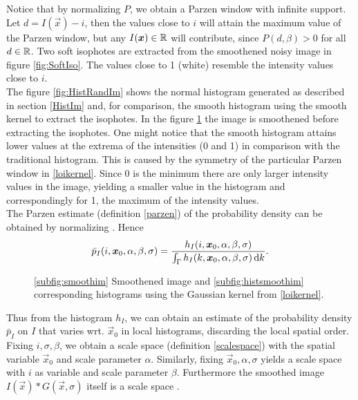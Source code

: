Notice that by normalizing $P$, we obtain a Parzen window with infinite support. Let $d=I(\vec{x})-i$, then the values close to $i$ will attain the maximum value of the Parzen window, but any $I(\boldsymbol{x} )\in \mathbb R$ will contribute, since $P(d,\beta)>0$ for all $d\in\mathbb R$. Two soft isophotes are extracted from the smoothened noisy image in figure \ref{fig:SoftIso}. The values close to 1 (white) resemble the intensity values close to $i$.\\
The figure \ref{fig:HistRandIm} shows the normal histogram generated as described in section \ref{HistIm} and, for comparison, the smooth histogram using the smooth kernel to extract the isophotes. In the figure \ref{fig:HistSmoothRandIm} the image is smoothened before extracting the isophotes. One might notice that the smooth histogram attains lower values at the extrema of the intensities (0 and 1) in comparison with the traditional histogram. This is caused by the symmetry of the particular Parzen window in \eqref{loikernel}. Since 0 is the minimum there are only larger intensity values in the image, yielding a smaller value in the histogram and correspondingly for 1, the maximum of the intensity values.\\

The Parzen estimate (definition \ref{parzen}) of the probability density can be obtained by normalizing \cite{dar.11}. Hence
\begin{equation}
\bar{p}_I(i,\boldsymbol{x} _0,\alpha,\beta,\sigma) = \frac{h_I(i,\boldsymbol{x} _0,\alpha,\beta,\sigma)}{\int_\Gamma h_I(k,\boldsymbol{x} _0,\alpha,\beta,\sigma)\,{\rm d} k}.
\end{equation}

\begin{figure}
  \centering
  \quad
  \caption{\ref{subfig:smoothim} Smoothened image and \ref{subfig:histsmoothim} corresponding histograms using the Gaussian kernel from \eqref{loikernel}.}\label{fig:HistSmoothRandIm}
\end{figure}

Thus from the histogram $h_I$, we can obtain an estimate of the probability density $\bar{p}_I$ on $I$ that varies wrt. $\vec{x}_0$ in local histograms, discarding the local spatial order.\\
Fixing $i,\sigma,\beta$, we obtain a scale space (definition \ref{scalespace}) with the spatial variable $\vec{x}_0$ and scale parameter $\alpha$. Similarly, fixing $\vec{x}_0,\alpha,\sigma$ yields a scale space with $i$ as variable and scale parameter $\beta$. Furthermore the smoothed image $I(\vec{x})*G(\vec{x},\sigma)$ itself is a scale space \cite{dar.12}.\\

